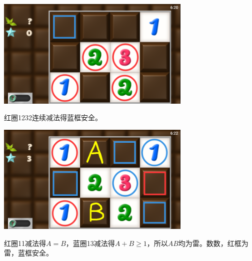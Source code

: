 \subsection{} %
\begin{center}
    \includegraphics[width=0.7\textwidth]{puzzle/68-1.png}
\end{center}
红圈1232连续减法得蓝框安全。
\begin{center}
    \includegraphics[width=0.7\textwidth]{puzzle/68-2.png}
\end{center}
红圈11减法得$A=B$，蓝圈13减法得$A+B\ge 1$，所以$AB$均为雷。数数，红框为雷，蓝框安全。

